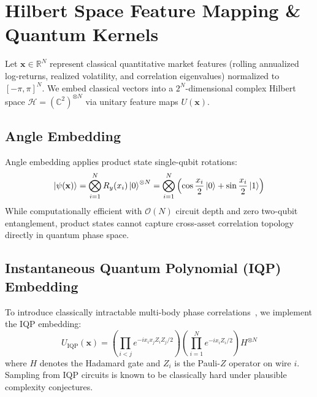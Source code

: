 \section{Hilbert Space Feature Mapping \& Quantum Kernels}
\label{sec:hilbert}

Let $\mathbf{x} \in \mathbb{R}^N$ represent classical quantitative market features (rolling annualized log-returns, realized volatility, and correlation eigenvalues) normalized to $[-\pi, \pi]^N$. We embed classical vectors into a $2^N$-dimensional complex Hilbert space $\mathcal{H} = (\mathbb{C}^2)^{\otimes N}$ via unitary feature maps $U(\mathbf{x})$.

\subsection{Angle Embedding}
Angle embedding applies product state single-qubit rotations:
\begin{equation}
    \ket{\psi(\mathbf{x})} = \bigotimes_{i=1}^N R_y(x_i) \ket{0}^{\otimes N} = \bigotimes_{i=1}^N \left( \cos\frac{x_i}{2}\ket{0} + \sin\frac{x_i}{2}\ket{1} \right)
\end{equation}
While computationally efficient with $\mathcal{O}(N)$ circuit depth and zero two-qubit entanglement, product states cannot capture cross-asset correlation topology directly in quantum phase space.

\subsection{Instantaneous Quantum Polynomial (IQP) Embedding}
To introduce classically intractable multi-body phase correlations~\cite{havlicek2019supervised}, we implement the IQP embedding:
\begin{equation}
    U_{\text{IQP}}(\mathbf{x}) = \left( \prod_{i < j} e^{-i x_i x_j Z_i Z_j / 2} \right) \left( \prod_{i=1}^N e^{-i x_i Z_i / 2} \right) H^{\otimes N}
\end{equation}
where $H$ denotes the Hadamard gate and $Z_i$ is the Pauli-$Z$ operator on wire $i$. Sampling from IQP circuits is known to be classically hard under plausible complexity conjectures.

